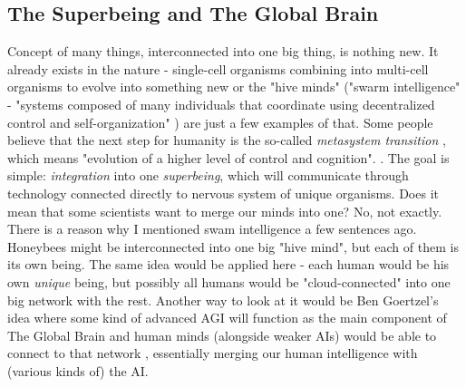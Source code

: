 \documentclass[12pt]{article}
\begin{document}
\subsection{The Superbeing and The Global Brain}
	Concept of many things, interconnected into one big thing, is nothing new. It already exists in the nature - single-cell organisms combining into multi-cell organisms to evolve into something new or the "hive minds" ("swarm intelligence" -  "systems composed of many individuals that coordinate using decentralized control and self-organization" \cite{swarm}) are just a few examples of that. Some people believe that the next step for humanity is the so-called \emph{metasystem transition} \cite{turchin:1}, which means "evolution of a higher level of control and cognition". \cite{heylighen:1}. The goal is simple: \emph{integration} into one \emph{superbeing}, which will communicate through technology connected directly to nervous system of unique organisms. Does it mean that some scientists want to merge our minds into one? No, not exactly. There is a reason why I mentioned swam intelligence a few sentences ago. Honeybees might be interconnected into one big "hive mind", but each of them is its own being. The same idea would be applied here - each human would be his own \emph{unique} being, but possibly all humans would be "cloud-connected" into one big network with the rest. Another way to look at it would be Ben Goertzel's idea where some kind of advanced AGI will function as the main component of The Global Brain and human minds (alongside weaker AIs) would be able to connect to that network \cite{globalbrain:1}, essentially merging our human intelligence with (various kinds of) the AI.
\end{document}
